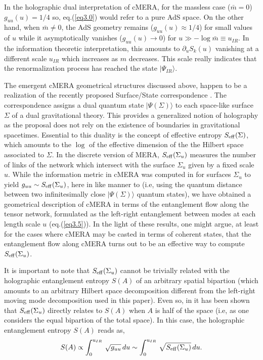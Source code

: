 \documentclass[preprint,aps]{revtex4}
\def\beq{\begin{equation}}
\def\eeq{\end{equation}}
\begin{document}
In the holographic dual interpretation of cMERA, for the massless case ($\bar{m}=0$) $g_{uu}(u) = 1/4$ so, eq.(\ref{eq3.0}) would  refer to a pure AdS space. On the other hand, when $\bar{m} \neq 0$, the AdS geometry remains ($g_{uu}(u) \approx 1/4$) for small values of $u$ while it asymptotically vanishes ($g_{uu}(u) \to 0$) for $u \gg -\log \bar{m}\equiv u_{IR}$. In the information theoretic interpretation, this amounts to $\partial_u S_k(u)$ vanishing at a different scale $u_{IR}$ which increases as $m$ decreases. This scale really indicates that the renormalization process has reached the state $|\Psi_{IR}\rangle$.

The emergent cMERA geometrical structures discussed above, happen to be a realization of the recently proposed Surface/State correspondence \cite{prog6, new_taka_cMERA}. The correspondence assigns a dual quantum state $|\Psi(\Sigma)\rangle$ to each space-like surface $\Sigma$ of a dual gravitational theory. This provides a generalized notion of holography as the proposal does not rely on the existence of boundaries in gravitational spacetimes. Essential to this duality is the concept of effective entropy $S_{\rm eff}(\Sigma)$, which amounts to the $\log$ of the effective dimension of the the Hilbert space associated to $\Sigma$. In the discrete version of MERA, $S_{\rm eff}(\Sigma_u)$ measures the number of links of the network which intersect with the surface $\Sigma_u$ given by a fixed scale $u$. 
While the information metric in cMERA was computed in \cite{taka1} for surfaces $\Sigma_u$ to yield $g_{uu}\sim S_{\rm eff}(\Sigma_u)$, here in like manner to \cite{taka1, prog6} (i.e, using the quantum distance between two infinitesimally close $|\Psi(\Sigma)\rangle$ quantum states), we have obtained a geometrical description of cMERA in terms of the entanglement flow along the tensor network, formulated as the left-right entanglement between modes at each length scale $u$ (eq.(\ref{eq3.5})). In the light of these results, one might argue, at least for the cases where cMERA may be casted in terms of coherent states, that the entanglement flow along cMERA turns out to be an effective way to compute $S_{\rm eff}(\Sigma_u)$. 

It is important to note that $ S_{\rm eff}(\Sigma_u)$ cannot be trivially related with the holographic entanglement entropy $S(A)$ of an arbitrary spatial bipartion (which amounts to an arbitrary Hilbert space decomposition different from the left-right moving mode decomposition used in this paper). Even so, in \cite{taka1} it has been shown that $S_{\rm eff}(\Sigma_u)$ directly relates to $S(A)$ when $A$ is half of the space (i.e, as one considers the equal bipartion of the total space). In this case, the holographic entanglement entropy $S(A)$ reads as,
\beq
\label{eq5.3ii}
S(A) \propto \int_{0}^{u_{IR}}\, \sqrt{g_{uu}}\, du \sim \int_{0}^{u_{IR}}\, \sqrt{S_{\rm eff}(\Sigma_u)}\, du.
\eeq
\end{document}
